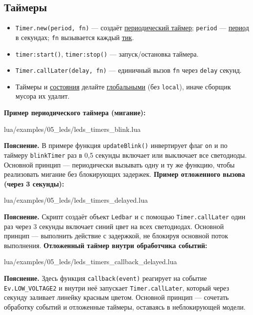 \subsection{Таймеры}
\begin{itemize}
  \item \verb|Timer.new(period, fn)| — создаёт \hyperlink{term:timer}{периодический таймер}; \verb|period| — \hyperlink{term:period}{период} в секундах; \verb|fn| вызывается каждый \hyperlink{term:tick}{тик}.
  \item \verb|timer:start()|, \verb|timer:stop()| — запуск/остановка таймера.
  \item \verb|Timer.callLater(delay, fn)| — единичный вызов \verb|fn| через \verb|delay| секунд.
  \item Таймеры и \hyperlink{term:state}{состояния} делайте \hyperlink{term:scope}{глобальными} (без \verb|local|), иначе сборщик мусора их удалит.
\end{itemize}
\textbf{Пример периодического таймера (мигание):}
\begin{codefile}{lua/examples/05_leds/leds_timers_blink.lua}
\end{codefile}
\textbf{Пояснение.} В примере функция \verb|updateBlink()| инвертирует флаг \verb|on| и по таймеру \verb|blinkTimer| раз в 0{,}5 секунды включает или выключает все светодиоды. Основной принцип — периодически вызывать одну и ту же функцию, чтобы реализовать мигание без блокирующих задержек.
\textbf{Пример отложенного вызова (через 3 секунды):}
\begin{codefile}{lua/examples/05_leds/leds_timers_delayed.lua}
\end{codefile}
\textbf{Пояснение.} Скрипт создаёт объект \verb|Ledbar| и с помощью \verb|Timer.callLater| один раз через 3 секунды включает синий цвет на всех светодиодах. Основной принцип — выполнить действие с задержкой, не блокируя основной поток выполнения.
\textbf{Отложенный таймер внутри обработчика событий:}
\begin{codefile}{lua/examples/05_leds/leds_timers_callback_delayed.lua}
\end{codefile}
\textbf{Пояснение.} Здесь функция \verb|callback(event)| реагирует на событие \verb|Ev.LOW_VOLTAGE2| и внутри неё запускает \verb|Timer.callLater|, который через секунду заливает линейку красным цветом. Основной принцип — сочетать обработку событий и отложенные таймеры, оставаясь в неблокирующей модели.
